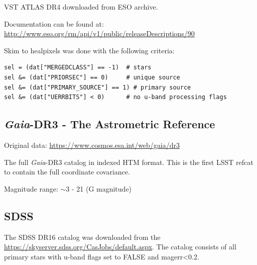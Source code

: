 VST ATLAS DR4 downloaded from ESO archive.

Documentation can be found at: \url{http://www.eso.org/rm/api/v1/public/releaseDescriptions/90}

Skim to healpixels was done with the following criteria:
\begin{verbatim}
sel = (dat["MERGEDCLASS"] == -1)  # stars
sel &= (dat["PRIORSEC"] == 0)     # unique source 
sel &= (dat["PRIMARY_SOURCE"] == 1) # primary source 
sel &= (dat["UERRBITS"] < 0)      # no u-band processing flags
\end{verbatim}

\subsection{\emph{Gaia}-DR3 - The Astrometric Reference}
\label{sec:gaiadr3}
Original data: \url{https://www.cosmos.esa.int/web/gaia/dr3}

The full \emph{Gaia}-DR3 catalog in indexed HTM format. 
This is the first LSST refcat to contain the full coordinate covariance.

Magnitude range: $\sim$3 - 21 (G magnitude)

\subsection{SDSS}
\label{sec:sdss}
The SDSS DR16 catalog was downloaded from the \href{SDSS SkyServer}{https://skyserver.sdss.org/CasJobs/default.aspx}.
The catalog consists of all primary stars with u-band flags set to FALSE and magerr<0.2.


